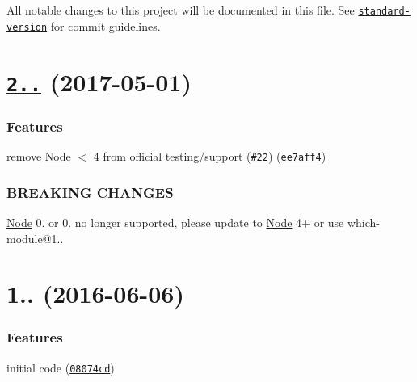 All notable changes to this project will be documented in this file. See \href{https://github.com/conventional-changelog/standard-version}{\tt standard-\/version} for commit guidelines.

\label{_2.0.0}%
 \section*{\href{https://github.com/nexdrew/which-module/compare/v1.0.0...v2.0.0}{\tt 2..} (2017-\/05-\/01)}

\subsubsection*{Features}


\begin{DoxyItemize}
\item remove \mbox{\hyperlink{classNode}{Node}} $<$ 4 from official testing/support (\href{https://github.com/nexdrew/which-module/issues/22}{\tt \#22}) (\href{https://github.com/nexdrew/which-module/commit/ee7aff4}{\tt ee7aff4})
\end{DoxyItemize}

\subsubsection*{B\+R\+E\+A\+K\+I\+NG C\+H\+A\+N\+G\+ES}


\begin{DoxyItemize}
\item \mbox{\hyperlink{classNode}{Node}} 0. or 0. no longer supported, please update to \mbox{\hyperlink{classNode}{Node}} 4+ or use which-\/module@1..
\end{DoxyItemize}

\label{_1.0.0}%
 \section*{1.. (2016-\/06-\/06)}

\subsubsection*{Features}


\begin{DoxyItemize}
\item initial code (\href{https://github.com/nexdrew/which-module/commit/08074cd}{\tt 08074cd}) 
\end{DoxyItemize}